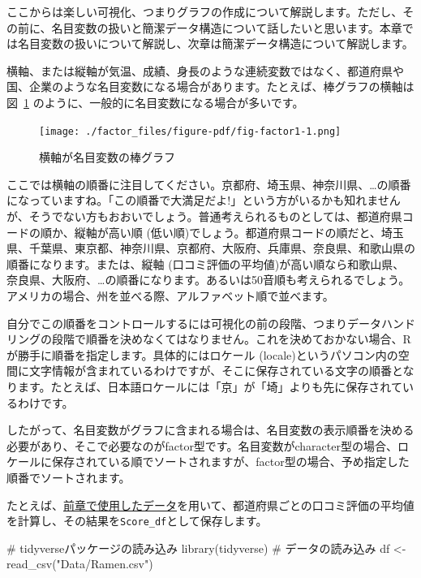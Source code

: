 \documentclass[
  a4paper,
  pandoc,
  ja=standard,
  jafont=haranoaji]{bxjsbook}
\newenvironment{Shaded}{\begin{snugshade}}{\end{snugshade}}
\newcommand{\CommentTok}[1]{\textcolor[rgb]{0.37,0.37,0.37}{#1}}
\newcommand{\FunctionTok}[1]{\textcolor[rgb]{0.28,0.35,0.67}{#1}}
\newcommand{\NormalTok}[1]{\textcolor[rgb]{0.00,0.48,0.65}{#1}}
\newcommand{\OtherTok}[1]{\textcolor[rgb]{0.00,0.48,0.65}{#1}}
\newcommand{\StringTok}[1]{\textcolor[rgb]{0.13,0.47,0.30}{#1}}
\begin{document}
ここからは楽しい可視化、つまりグラフの作成について解説します。ただし、その前に、名目変数の扱いと簡潔データ構造について話したいと思います。本章では名目変数の扱いについて解説し、次章は簡潔データ構造について解説します。

横軸、または縦軸が気温、成績、身長のような連続変数ではなく、都道府県や国、企業のような名目変数になる場合があります。たとえば、棒グラフの横軸は
図~\ref{fig-factor1} のように、一般的に名目変数になる場合が多いです。

\begin{figure}

{\centering \texttt{[image: ./factor\_files/figure-pdf/fig-factor1-1.png]}

}

\caption{\label{fig-factor1}横軸が名目変数の棒グラフ}

\end{figure}

ここでは横軸の順番に注目してください。京都府、埼玉県、神奈川県、\ldots の順番になっていますね。「この順番で大満足だよ!」という方がいるかも知れませんが、そうでない方もおおいでしょう。普通考えられるものとしては、都道府県コードの順か、縦軸が高い順
(低い順)でしょう。都道府県コードの順だと、埼玉県、千葉県、東京都、神奈川県、京都府、大阪府、兵庫県、奈良県、和歌山県の順番になります。または、縦軸
(口コミ評価の平均値)が高い順なら和歌山県、奈良県、大阪府、\ldots の順番になります。あるいは50音順も考えられるでしょう。アメリカの場合、州を並べる際、アルファベット順で並べます。

自分でこの順番をコントロールするには可視化の前の段階、つまりデータハンドリングの段階で順番を決めなくてはなりません。これを決めておかない場合、Rが勝手に順番を指定します。具体的にはロケール
(locale)というパソコン内の空間に文字情報が含まれているわけですが、そこに保存されている文字の順番となります。たとえば、日本語ロケールには「京」が「埼」よりも先に保存されているわけです。

したがって、名目変数がグラフに含まれる場合は、名目変数の表示順番を決める必要があり、そこで必要なのがfactor型です。名目変数がcharacter型の場合、ロケールに保存されている順でソートされますが、factor型の場合、予め指定した順番でソートされます。

たとえば、\href{Data/Ramen.csv}{前章で使用したデータ}を用いて、都道府県ごとの口コミ評価の平均値を計算し、その結果を\texttt{Score\_df}として保存します。

\begin{Shaded}
\begin{Highlighting}[numbers=left,,]
\CommentTok{\# tidyverseパッケージの読み込み}
\FunctionTok{library}\NormalTok{(tidyverse)}
\CommentTok{\# データの読み込み}
\NormalTok{df }\OtherTok{\textless{}{-}} \FunctionTok{read\_csv}\NormalTok{(}\StringTok{"Data/Ramen.csv"}\NormalTok{)}
\end{Highlighting}
\end{Shaded}
\end{document}

